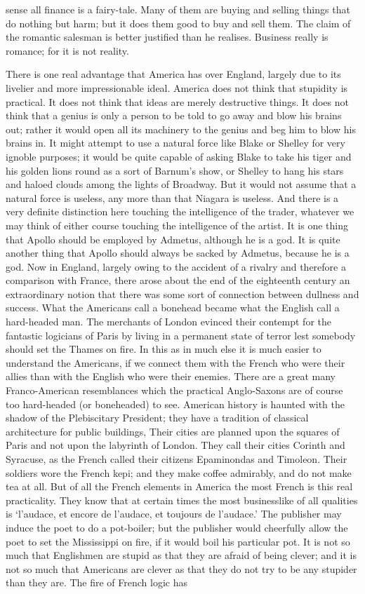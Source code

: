 \documentclass{book}
\begin{document}
sense all finance is a fairy-tale. Many of them are buying and selling things that do nothing but harm; but it does them good to buy and sell them. The claim of the romantic salesman is better justified than he realises. Business really is romance; for it is not reality.

There is one real advantage that America has over England, largely due to its livelier and more impressionable ideal. America does not think that stupidity is practical. It does not think that ideas are merely destructive things. It does not think that a genius is only a person to be told to go away and blow his brains out; rather it would open all its machinery to the genius and beg him to blow his brains in. It might attempt to use a natural force like Blake or Shelley for very ignoble purposes; it would be quite capable of asking Blake to take his tiger and his golden lions round as a sort of Barnum’s show, or Shelley to hang his stars and haloed clouds among the lights of Broadway. But it would not assume that a natural force is useless, any more than that Niagara is useless. And there is a very definite distinction here touching the intelligence of the trader, whatever we may think of either course touching the intelligence of the artist. It is one thing that Apollo should be employed by Admetus, although he is a god. It is quite another thing that Apollo should always be sacked by Admetus, because he is a god. Now in England, largely owing to the accident of a rivalry and therefore a comparison with France, there arose about the end of the eighteenth century an extraordinary notion that there was some sort of connection between dullness and success. What the Americans call a bonehead became what the English call a hard-headed man. The merchants of London evinced their contempt for the fantastic logicians of Paris by living in a permanent state of terror lest somebody should set the Thames on fire. In this as in much else it is much easier to understand the Americans, if we connect them with the French who were their allies than with the English who were their enemies. There are a great many Franco-American resemblances which the practical Anglo-Saxons are of course too hard-headed (or boneheaded) to see. American history is haunted with the shadow of the Plebiscitary President; they have a tradition of classical architecture for public buildings, Their cities are planned upon the squares of Paris and not upon the labyrinth of London. They call their cities Corinth and Syracuse, as the French called their citizens Epaminondas and Timoleon. Their soldiers wore the French kepi; and they make coffee admirably, and do not make tea at all. But of all the French elements in America the most French is this real practicality. They know that at certain times the most businesslike of all qualities is ‘l’audace, et encore de l’audace, et toujours de l’audace.’ The publisher may induce the poet to do a pot-boiler; but the publisher would cheerfully allow the poet to set the Mississippi on fire, if it would boil his particular pot. It is not so much that Englishmen are stupid as that they are afraid of being clever; and it is not so much that Americans are clever as that they do not try to be any stupider than they are. The fire of French logic has 
\end{document}
